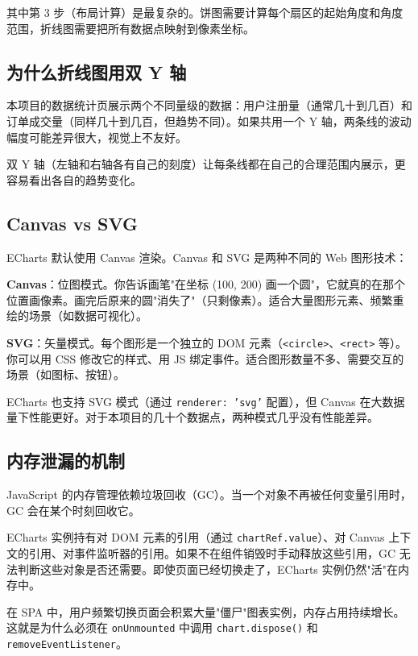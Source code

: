 \documentclass[12pt,a4paper]{ctexart}
\begin{document}
其中第 3 步（布局计算）是最复杂的。饼图需要计算每个扇区的起始角度和角度范围，折线图需要把所有数据点映射到像素坐标。

\subsection{为什么折线图用双 Y 轴}

本项目的数据统计页展示两个不同量级的数据：用户注册量（通常几十到几百）和订单成交量（同样几十到几百，但趋势不同）。如果共用一个 Y 轴，两条线的波动幅度可能差异很大，视觉上不友好。

双 Y 轴（左轴和右轴各有自己的刻度）让每条线都在自己的合理范围内展示，更容易看出各自的趋势变化。

\subsection{Canvas vs SVG}

ECharts 默认使用 Canvas 渲染。Canvas 和 SVG 是两种不同的 Web 图形技术：

\textbf{Canvas}：位图模式。你告诉画笔"在坐标 (100, 200) 画一个圆"，它就真的在那个位置画像素。画完后原来的圆"消失了"（只剩像素）。适合大量图形元素、频繁重绘的场景（如数据可视化）。

\textbf{SVG}：矢量模式。每个图形是一个独立的 DOM 元素（\texttt{<circle>}、\texttt{<rect>} 等）。你可以用 CSS 修改它的样式、用 JS 绑定事件。适合图形数量不多、需要交互的场景（如图标、按钮）。

ECharts 也支持 SVG 模式（通过 \texttt{renderer: 'svg'} 配置），但 Canvas 在大数据量下性能更好。对于本项目的几十个数据点，两种模式几乎没有性能差异。

\subsection{内存泄漏的机制}

JavaScript 的内存管理依赖垃圾回收（GC）。当一个对象不再被任何变量引用时，GC 会在某个时刻回收它。

ECharts 实例持有对 DOM 元素的引用（通过 \texttt{chartRef.value}）、对 Canvas 上下文的引用、对事件监听器的引用。如果不在组件销毁时手动释放这些引用，GC 无法判断这些对象是否还需要。即使页面已经切换走了，ECharts 实例仍然"活"在内存中。

在 SPA 中，用户频繁切换页面会积累大量"僵尸"图表实例，内存占用持续增长。这就是为什么必须在 \texttt{onUnmounted} 中调用 \texttt{chart.dispose()} 和 \texttt{removeEventListener}。

\end{document}
